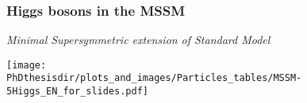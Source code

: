 \begin{frame}
\frametitle{Higgs bosons in the MSSM}
\begin{center}
\emph{Minimal Supersymmetric extension of Standard Model}

\vspace{2\baselineskip}

\texttt{[image: \\PhDthesisdir/plots\_and\_images/Particles\_tables/MSSM-5Higgs\_EN\_for\_slides.pdf]}
\end{center}
\end{frame}
